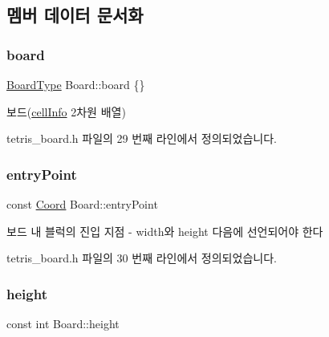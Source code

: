 \subsection{멤버 데이터 문서화}
\mbox{\label{class_board_ad26aada4f19d2ca0c7bd534e8f466b6b}} 
\subsubsection{\texorpdfstring{board}{board}}
{\footnotesize\ttfamily \mbox{\hyperlink{class_board_a84bf794bc185e31e333b78bb003c4bc3}{Board\+Type}} Board\+::board \{\}\hspace{0.3cm}{\ttfamily [private]}}



보드(\mbox{\hyperlink{struct_board_1_1cell_info}{cell\+Info}} 2차원 배열) 



tetris\+\_\+board.\+h 파일의 29 번째 라인에서 정의되었습니다.

\mbox{\label{class_board_a51d0b870dfe79367034bdda967e63a82}} 
\subsubsection{\texorpdfstring{entry\+Point}{entryPoint}}
{\footnotesize\ttfamily const \mbox{\hyperlink{struct_coord}{Coord}} Board\+::entry\+Point\hspace{0.3cm}{\ttfamily [private]}}



보드 내 블럭의 진입 지점 -\/ width와 height 다음에 선언되어야 한다 



tetris\+\_\+board.\+h 파일의 30 번째 라인에서 정의되었습니다.

\mbox{\label{class_board_a37b65287f3b416ed31b0f15cfd9b3f7c}} 
\subsubsection{\texorpdfstring{height}{height}}
{\footnotesize\ttfamily const int Board\+::height\hspace{0.3cm}{\ttfamily [private]}}



